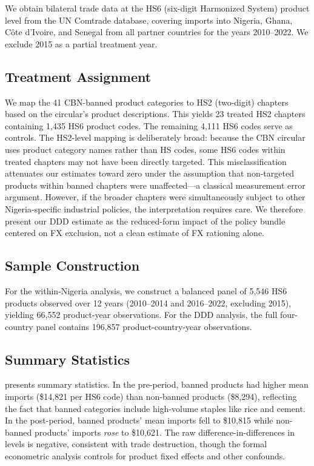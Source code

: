 \documentclass[12pt]{article}
\begin{document}
We obtain bilateral trade data at the HS6 (six-digit Harmonized System) product level from the UN Comtrade database, covering imports into Nigeria, Ghana, C\^{o}te d'Ivoire, and Senegal from all partner countries for the years 2010--2022. We exclude 2015 as a partial treatment year.

\subsection{Treatment Assignment}

We map the 41 CBN-banned product categories to HS2 (two-digit) chapters based on the circular's product descriptions. This yields 23 treated HS2 chapters containing 1,435 HS6 product codes. The remaining 4,111 HS6 codes serve as controls. The HS2-level mapping is deliberately broad: because the CBN circular uses product category names rather than HS codes, some HS6 codes within treated chapters may not have been directly targeted. This misclassification attenuates our estimates toward zero under the assumption that non-targeted products within banned chapters were unaffected---a classical measurement error argument. However, if the broader chapters were simultaneously subject to other Nigeria-specific industrial policies, the interpretation requires care. We therefore present our DDD estimate as the reduced-form impact of the policy bundle centered on FX exclusion, not a clean estimate of FX rationing alone.

\subsection{Sample Construction}

For the within-Nigeria analysis, we construct a balanced panel of 5,546 HS6 products observed over 12 years (2010--2014 and 2016--2022, excluding 2015), yielding 66,552 product-year observations. For the DDD analysis, the full four-country panel contains 196,857 product-country-year observations.

\subsection{Summary Statistics}



 presents summary statistics. In the pre-period, banned products had higher mean imports (\$14,821 per HS6 code) than non-banned products (\$8,294), reflecting the fact that banned categories include high-volume staples like rice and cement. In the post-period, banned products' mean imports fell to \$10,815 while non-banned products' imports \textit{rose} to \$10,621. The raw difference-in-differences in levels is negative, consistent with trade destruction, though the formal econometric analysis controls for product fixed effects and other confounds.
\end{document}
